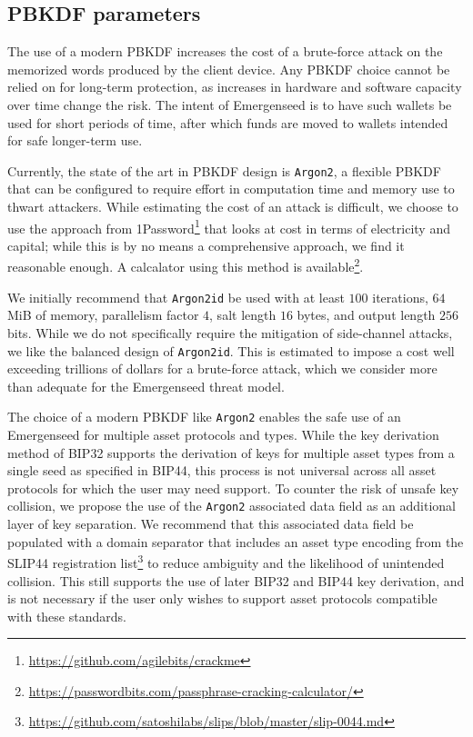 \documentclass{article}
\begin{document}
\subsection{PBKDF parameters}

The use of a modern PBKDF increases the cost of a brute-force attack on the memorized words produced by the client device.
Any PBKDF choice cannot be relied on for long-term protection, as increases in hardware and software capacity over time change the risk.
The intent of Emergenseed is to have such wallets be used for short periods of time, after which funds are moved to wallets intended for safe longer-term use.

Currently, the state of the art in PBKDF design is \texttt{Argon2}, a flexible PBKDF that can be configured to require effort in computation time and memory use to thwart attackers.
While estimating the cost of an attack is difficult, we choose to use the approach from 1Password\footnote{\url{https://github.com/agilebits/crackme}} that looks at cost in terms of electricity and capital; while this is by no means a comprehensive approach, we find it reasonable enough.
A calcalator using this method is available\footnote{\url{https://passwordbits.com/passphrase-cracking-calculator/}}.

We initially recommend that \texttt{Argon2id} be used with at least $100$ iterations, $64$ MiB of memory, parallelism factor $4$, salt length $16$ bytes, and output length $256$ bits.
While we do not specifically require the mitigation of side-channel attacks, we like the balanced design of \texttt{Argon2id}.
This is estimated to impose a cost well exceeding trillions of dollars for a brute-force attack, which we consider more than adequate for the Emergenseed threat model.

The choice of a modern PBKDF like \texttt{Argon2} enables the safe use of an Emergenseed for multiple asset protocols and types.
While the key derivation method of BIP32 supports the derivation of keys for multiple asset types from a single seed as specified in BIP44, this process is not universal across all asset protocols for which the user may need support.
To counter the risk of unsafe key collision, we propose the use of the \texttt{Argon2} associated data field as an additional layer of key separation.
We recommend that this associated data field be populated with a domain separator that includes an asset type encoding from the SLIP44 registration list\footnote{\url{https://github.com/satoshilabs/slips/blob/master/slip-0044.md}} to reduce ambiguity and the likelihood of unintended collision.
This still supports the use of later BIP32 and BIP44 key derivation, and is not necessary if the user only wishes to support asset protocols compatible with these standards.
\end{document}
